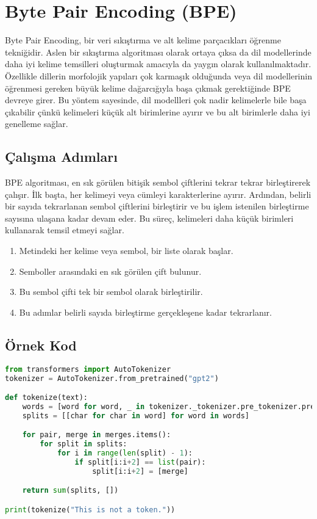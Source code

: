 \section{Byte Pair Encoding (BPE)}

Byte Pair Encoding, bir veri sıkıştırma ve alt kelime parçacıkları öğrenme tekniğidir. Aslen bir sıkıştırma algoritması olarak ortaya çıksa da dil modellerinde daha iyi kelime temsilleri oluşturmak amacıyla da yaygın olarak kullanılmaktadır. Özellikle dillerin morfolojik yapıları çok karmaşık olduğunda veya dil modellerinin öğrenmesi gereken büyük kelime dağarcığıyla başa çıkmak gerektiğinde BPE devreye girer. Bu yöntem sayesinde, dil modellleri çok nadir kelimelerle bile başa çıkabilir çünkü kelimeleri küçük alt birimlerine ayırır ve bu alt birimlerle daha iyi genelleme sağlar. 

\subsection{Çalışma Adımları}

BPE algoritması, en sık görülen bitişik sembol çiftlerini tekrar tekrar birleştirerek çalışır. İlk başta, her kelimeyi veya cümleyi karakterlerine ayırır. Ardından, belirli bir sayıda tekrarlanan sembol çiftlerini birleştirir ve bu işlem istenilen birleştirme sayısına ulaşana kadar devam eder. Bu süreç, kelimeleri daha küçük birimleri kullanarak temsil etmeyi sağlar.

\begin{enumerate}
    \item Metindeki her kelime veya sembol, bir liste olarak başlar.
    \item Semboller arasındaki en sık görülen çift bulunur.
    \item Bu sembol çifti tek bir sembol olarak birleştirilir.
    \item Bu adımlar belirli sayıda birleştirme gerçekleşene kadar tekrarlanır.
\end{enumerate}

\subsection{Örnek Kod}

\begin{lstlisting}[language=Python]
from transformers import AutoTokenizer
tokenizer = AutoTokenizer.from_pretrained("gpt2")

def tokenize(text):
    words = [word for word, _ in tokenizer._tokenizer.pre_tokenizer.pre_tokenize_str(text)]
    splits = [[char for char in word] for word in words]

    for pair, merge in merges.items():
        for split in splits:
            for i in range(len(split) - 1):
                if split[i:i+2] == list(pair):
                    split[i:i+2] = [merge]

    return sum(splits, [])

print(tokenize("This is not a token."))  
\end{lstlisting}

\newpage